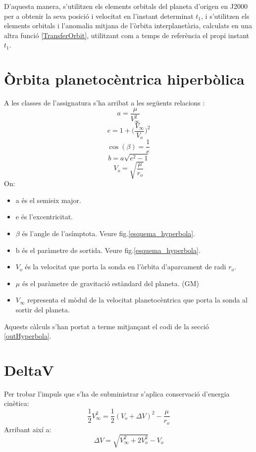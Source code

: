 D'aquesta manera, s'utilitzen els elements orbitals del planeta d'origen en J2000 per a obtenir la seva posició i velocitat en l'instant determinat $t_1$, i s'utilitzen els elements orbitals i l'anomalia mitjana de l'òrbita interplanetària, calculats en una altra funció \ref{TransferOrbit}, utilitzant com a temps de referència el propi instant $t_1$.

\section{Òrbita planetocèntrica hiperbòlica}
A les classes de l'assignatura s'ha arribat a les següents relacions \cite{Calaf2017d}:
\begin{equation}
a = \frac{\mu}{V_{\infty}^{2}}
\end{equation}
\begin{equation}
e = 1 + \Big(\frac{V_{\infty}}{V_{o}}\Big)^2
\end{equation}
\begin{equation}
\cos(\beta) = \frac{1}{e}
\end{equation}
\begin{equation}
b = a\sqrt{e^2-1}
\end{equation}
\begin{equation}
V_o = \sqrt{\frac{\mu}{r_o}}
\end{equation}
On:
\begin{itemize}
	\item a és el semieix major.
	\item e és l'excentricitat.
	\item $\beta$ és l'angle de l'asímptota. Veure fig.\ref{esquema_hyperbola}.
	\item b és el paràmetre de sortida. Veure fig.\ref{esquema_hyperbola}.
	\item $V_o$ és la velocitat que porta la sonda en l'òrbita d'aparcament de radi $r_o$.
	\item $\mu$ és el paràmetre de gravitació estàndard del planeta. (GM)
	\item $V_{\infty}$ representa el mòdul de la velocitat planetocèntrica que porta la sonda al sortir del planeta.
\end{itemize}
Aquests càlculs s'han portat a terme mitjançant el codi de la secció \ref{outHyperbola}.
\section{DeltaV}
Per trobar l'impuls que s'ha de subministrar s'aplica conservació d'energia cinètica:
\begin{equation*}
\frac{1}{2}V_{\infty}^2 =\frac{1}{2}(V_o + \Delta V)^2 - \frac{\mu}{r_o}
\end{equation*}
Arribant així a:
\begin{equation}
\Delta V = \sqrt{V_{\infty}^2+2V_{o}^2} - V_o
\end{equation}

